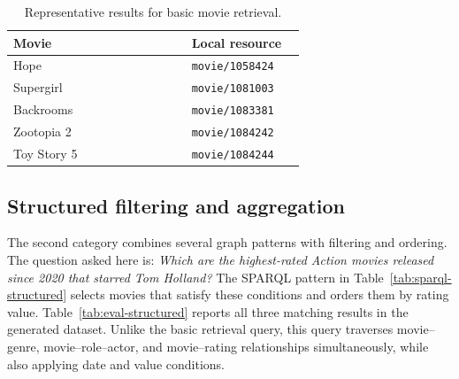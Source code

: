 \begin{table}[!htbp]
    \centering
    \caption{Representative results for basic movie retrieval.}
    \label{tab:eval-basic}
    \small
    \begin{tabular}{p{0.55\linewidth}p{0.35\linewidth}}
        \toprule
        \textbf{Movie} & \textbf{Local resource} \\
        \midrule
        Hope & \texttt{movie/1058424} \\
        Supergirl & \texttt{movie/1081003} \\
        Backrooms & \texttt{movie/1083381} \\
        Zootopia 2 & \texttt{movie/1084242} \\
        Toy Story 5 & \texttt{movie/1084244} \\
        \bottomrule
    \end{tabular}
\end{table}

\subsection{Structured filtering and aggregation}

The second category combines several graph patterns with filtering and
ordering. The question asked here is: \emph{Which are the highest-rated
Action movies released since 2020 that starred Tom Holland?} The SPARQL
pattern in Table~\ref{tab:sparql-structured} selects movies that satisfy
these conditions and orders them by rating value. Table~\ref{tab:eval-structured}
reports all three matching results in the generated dataset. Unlike the
basic retrieval query, this query traverses movie--genre, movie--role--actor, and
movie--rating relationships simultaneously, while also applying date and
value conditions.


